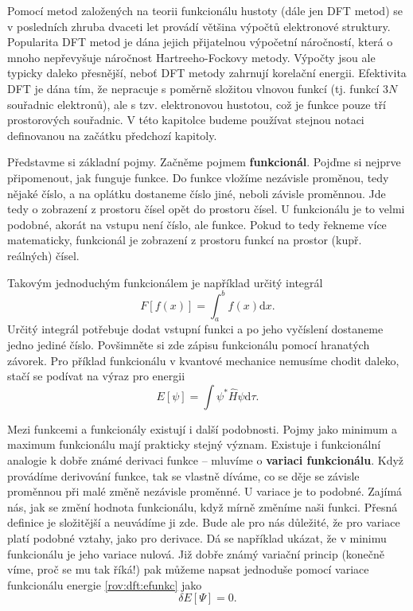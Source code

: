 Pomocí metod založených na teorii funkcionálu hustoty (dále jen DFT metod) se v posledních zhruba dvaceti let provádí většina výpočtů elektronové struktury. Popularita DFT metod je dána jejich přijatelnou výpočetní náročností, která o mnoho nepřevyšuje náročnost Hartreeho-Fockovy 
metody. Výpočty jsou ale typicky daleko přesnější, neboť DFT metody zahrnují korelační energii. Efektivita DFT je dána tím, že nepracuje s poměrně složitou vlnovou funkcí (tj. funkcí 3$N$ souřadnic elektronů), ale s tzv. elektronovou hustotou, což je funkce pouze tří prostorových souřadnic. 
V této kapitolce budeme používat stejnou notaci definovanou na začátku předchozí kapitoly.

Představme si základní pojmy. Začněme pojmem \textbf{funkcionál}. Pojďme si nejprve připomenout, jak funguje funkce. Do funkce vložíme nezávisle proměnou, tedy nějaké číslo, a na oplátku dostaneme číslo jiné, neboli závisle proměnnou. Jde tedy o zobrazení z prostoru čísel opět do prostoru čísel. U funkcionálu je to velmi podobné, akorát na vstupu není číslo, ale funkce. Pokud to tedy řekneme více matematicky, funkcionál je zobrazení z prostoru funkcí na prostor (kupř. reálných) čísel.

Takovým jednoduchým funkcionálem je například určitý integrál
$$
F[f(x)] = \int_a^b f(x) \mathrm{d}x.
$$
Určitý integrál potřebuje dodat vstupní funkci a po jeho vyčíslení dostaneme jedno jediné číslo. Povšimněte si zde zápisu funkcionálu pomocí hranatých závorek.  
Pro příklad funkcionálu v kvantové mechanice nemusíme chodit daleko, stačí se podívat na výraz pro energii
$$
E[\psi] = \int \psi^*\hat{H}\psi \mathrm{d}\tau .
\label{rov:dft:efunkc}
$$


Mezi funkcemi a funkcionály existují i další podobnosti. Pojmy jako minimum a maximum funkcionálu mají prakticky stejný význam. Existuje i funkcionální analogie k dobře známé derivaci funkce -- mluvíme o \textbf{variaci funkcionálu}.
Když provádíme derivování funkce, tak se vlastně díváme, co se děje se závisle proměnnou při malé změně nezávisle proměnné.
U variace je to podobné. Zajímá nás, jak se změní hodnota funkcionálu, když mírně změníme naši funkci. Přesná definice je složitější a neuvádíme ji zde. Bude ale pro nás důležité, že pro variace platí podobné vztahy, jako pro derivace. Dá se například ukázat, že v minimu funkcionálu je jeho variace nulová. Již dobře známý variační princip (konečně víme, proč se mu tak říká!) pak můžeme napsat jednoduše pomocí variace funkcionálu energie \eqref{rov:dft:efunkc} jako
\begin{equation}
\delta E[\Psi] = 0 .
\label{rov:dft:varprincip}
\end{equation}

